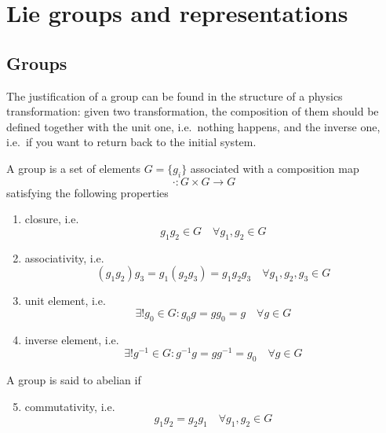 \part{Lie groups and representations}

\chapter{Groups}

    The justification of a group can be found in the structure of a physics transformation: given two transformation, the composition of them should be defined together with the unit one, i.e.~nothing happens, and the inverse one, i.e.~if you want to return back to the initial system.

    \begin{definition}[Group]
        A group is a set of elements $G = \{g_i\}$ associated with a composition map 
        \begin{equation*}
            \cdot \colon G \times G \rightarrow G
        \end{equation*}
        satisfying the following properties
        \begin{enumerate}
            \item closure, i.e.
            \begin{equation*}
                g_1 g_2 \in G \quad \forall g_1, g_2 \in G
            \end{equation*}
            \item associativity, i.e.
            \begin{equation*}
                (g_1 g_2)g_3 = g_1(g_2 g_3) = g_1 g_2 g_3 \quad \forall g_1, g_2, g_3 \in G
            \end{equation*}
            \item unit element, i.e.
            \begin{equation*}
                \exists! g_0 \in G \colon g_0 g = g g_0 = g \quad \forall g \in G
            \end{equation*}
            \item inverse element, i.e.
            \begin{equation*}
                \exists! g^{-1} \in G \colon g^{-1} g = g g^{-1} = g_0 \quad \forall g \in G
            \end{equation*}
        \end{enumerate}
    \end{definition}

    \begin{definition}
        A group is said to abelian if 
        \begin{enumerate}
        \setcounter{enumi}{4}
            \item commutativity, i.e.
            \begin{equation*}
                g_1 g_2 = g_2 g_1 \quad \forall g_1, g_2 \in G
            \end{equation*}
        \end{enumerate}
    \end{definition}

